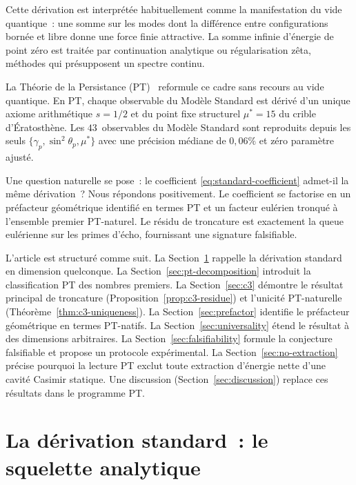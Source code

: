 \documentclass[11pt,a4paper]{article}
\begin{document}
Cette dérivation est interprétée habituellement comme la manifestation du vide quantique~: une
somme sur les modes dont la différence entre configurations bornée et libre donne une force finie
attractive. La somme infinie d'énergie de point zéro est traitée par continuation analytique ou
régularisation zêta, méthodes qui présupposent un spectre continu.

La Théorie de la Persistance (PT)~\cite{Senez2026} reformule ce cadre sans recours au vide
quantique. En PT, chaque observable du Modèle Standard est dérivé d'un unique axiome arithmétique
$s = 1/2$ et du point fixe structurel $\mu^{*} = 15$ du crible d'Ératosthène. Les
$43$~observables du Modèle Standard sont reproduits depuis les seuls
$\{\gamma_{p}, \sin^{2}\theta_{p}, \mu^{*}\}$ avec une précision médiane de $0{,}06\%$ et zéro
paramètre ajusté.

Une question naturelle se pose~: le coefficient \eqref{eq:standard-coefficient} admet-il la même
dérivation~? Nous répondons positivement. Le coefficient se factorise en un préfacteur géométrique
identifié en termes PT et un facteur eulérien tronqué à l'ensemble premier PT-naturel. Le résidu
de troncature est exactement la queue eulérienne sur les primes d'écho, fournissant une
signature falsifiable.

L'article est structuré comme suit. La Section~\ref{sec:standard} rappelle la dérivation standard
en dimension quelconque. La Section~\ref{sec:pt-decomposition} introduit la classification PT des
nombres premiers. La Section~\ref{sec:c3} démontre le résultat principal de troncature
(Proposition~\ref{prop:c3-residue}) et l'unicité PT-naturelle (Théorème~\ref{thm:c3-uniqueness}). La Section~\ref{sec:prefactor} identifie le préfacteur
géométrique en termes PT-natifs. La Section~\ref{sec:universality} étend le résultat à des
dimensions arbitraires. La Section~\ref{sec:falsifiability} formule la conjecture falsifiable et
propose un protocole expérimental. La Section~\ref{sec:no-extraction} précise pourquoi la lecture
PT exclut toute extraction d'énergie nette d'une cavité Casimir statique. Une discussion
(Section~\ref{sec:discussion}) replace ces résultats dans le programme PT.

\section{La dérivation standard~: le squelette analytique}
\label{sec:standard}
\end{document}
